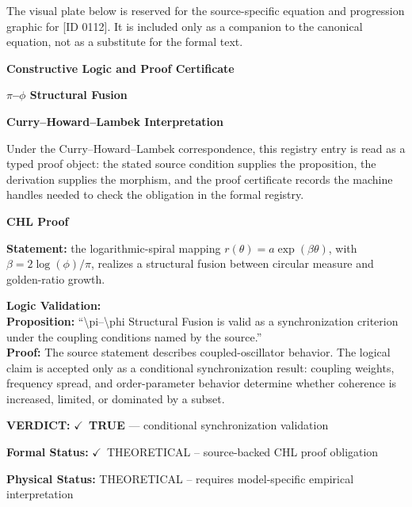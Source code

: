 \begingroup\footnotesize\sloppy
The visual plate below is reserved for the source-specific equation and progression graphic for [ID 0112]. It is included only as a companion to the canonical equation, not as a substitute for the formal text.
\par\endgroup
\ifTZPDarkEdition
{}
\fi

\clearpage
\begingroup\tzpsupportsetup
\noindent\textbf{\fontsize{10.8pt}{12.8pt}\selectfont [ID 0112] Constructive Logic and Proof Certificate}\par
\noindent\textbf{\fontsize{10pt}{12pt}\selectfont $\pi$--$\phi$ Structural Fusion}\par
\vspace{0.45em}
\begingroup
\footnotesize
\setlength{\parskip}{0.22em}
\setlength{\parindent}{0pt}
\noindent\textbf{Curry--Howard--Lambek Interpretation}\par
Under the Curry--Howard--Lambek correspondence, this registry entry is read as a typed proof
object: the stated source condition supplies the proposition, the derivation supplies the
morphism, and the proof certificate records the machine handles needed to check the obligation
in the formal registry.

\vspace{0.45em}
\noindent\textbf{CHL Proof}\par
\textbf{Statement:} the logarithmic-spiral mapping \(r(\theta)=a\exp(\beta\theta)\), with
\(\beta=2\log(\phi)/\pi\), realizes a structural fusion between circular measure and golden-ratio growth.

\textbf{Logic Validation:}\\
\textbf{Proposition:} ``\textbackslash{}pi--\textbackslash{}phi Structural Fusion is valid as a synchronization criterion under the
coupling conditions named by the source.''\\
\textbf{Proof:} The source statement describes coupled-oscillator behavior. The logical claim is
accepted only as a conditional synchronization result: coupling weights, frequency
spread, and order-parameter behavior determine whether coherence is increased, limited,
or dominated by a subset.

\textbf{VERDICT:} \ensuremath{\checkmark}\ \textbf{TRUE} --- conditional synchronization validation

\textbf{Formal Status:} \ensuremath{\checkmark}\ THEORETICAL -- source-backed CHL proof obligation

\textbf{Physical Status:} THEORETICAL -- requires model-specific empirical interpretation
\par\vspace{0.45em}
\par
\ifTZPDarkEdition
{}
\fi
\endgroup
\endgroup
